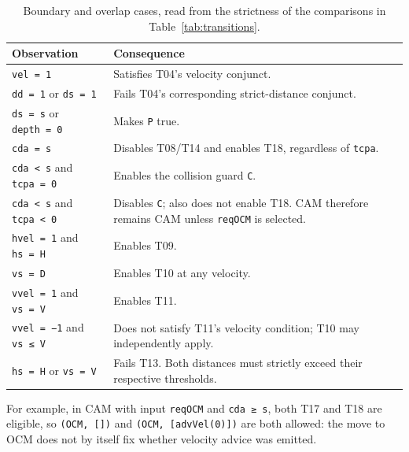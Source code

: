 \documentclass[
  10pt,
]{article}
\begin{document}
\begin{longtable}[]{@{}
  >{\raggedright\arraybackslash}p{}
  >{\raggedright\arraybackslash}p{}@{}}
\caption{Boundary and overlap cases, read from the strictness of the comparisons in Table~\ref{tab:transitions}.}\label{tab:boundary}\\
\toprule\noalign{}
\begin{minipage}[b]{\linewidth}\raggedright
Observation
\end{minipage} & \begin{minipage}[b]{\linewidth}\raggedright
Consequence
\end{minipage} \\
\midrule\noalign{}
\endhead
\bottomrule\noalign{}
\endlastfoot
\texttt{vel\ =\ 1} & Satisfies T04's velocity conjunct. \\
\texttt{dd\ =\ 1} or \texttt{ds\ =\ 1} & Fails T04's corresponding
strict-distance conjunct. \\
\texttt{ds\ =\ s} or \texttt{depth\ =\ 0} & Makes \texttt{P} true. \\
\texttt{cda\ =\ s} & Disables T08/T14 and enables T18, regardless of
\texttt{tcpa}. \\
\texttt{cda\ \textless{}\ s} and \texttt{tcpa\ =\ 0} & Enables the
collision guard \texttt{C}. \\
\texttt{cda\ \textless{}\ s} and \texttt{tcpa\ \textless{}\ 0} &
Disables \texttt{C}; also does not enable T18. CAM therefore remains CAM
unless \texttt{reqOCM} is selected. \\
\texttt{hvel\ =\ 1} and \texttt{hs\ =\ H} & Enables T09. \\
\texttt{vs\ =\ D} & Enables T10 at any velocity. \\
\texttt{vvel\ =\ 1} and \texttt{vs\ =\ V} & Enables T11. \\
\texttt{vvel\ =\ −1} and \texttt{vs\ ≤\ V} & Does not satisfy T11's
velocity condition; T10 may independently apply. \\
\texttt{hs\ =\ H} or \texttt{vs\ =\ V} & Fails T13. Both distances must
strictly exceed their respective thresholds. \\
\end{longtable}

For example, in CAM with input \texttt{reqOCM} and \texttt{cda\ ≥\ s},
both T17 and T18 are eligible, so \texttt{(OCM,\ {[}{]})} and
\texttt{(OCM,\ {[}advVel(0){]})} are both allowed: the move to OCM does
not by itself fix whether velocity advice was emitted.
\end{document}
